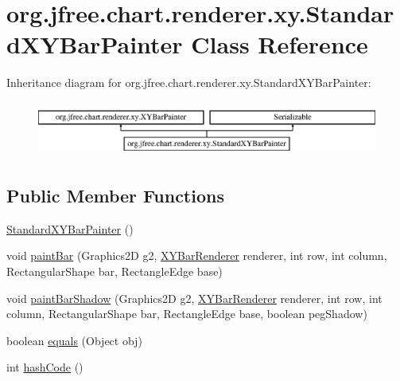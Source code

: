 \hypertarget{classorg_1_1jfree_1_1chart_1_1renderer_1_1xy_1_1_standard_x_y_bar_painter}{}\section{org.\+jfree.\+chart.\+renderer.\+xy.\+Standard\+X\+Y\+Bar\+Painter Class Reference}
\label{classorg_1_1jfree_1_1chart_1_1renderer_1_1xy_1_1_standard_x_y_bar_painter}
Inheritance diagram for org.\+jfree.\+chart.\+renderer.\+xy.\+Standard\+X\+Y\+Bar\+Painter\+:\begin{figure}[H]
\begin{center}
\leavevmode
\includegraphics[height=1.830065cm]{classorg_1_1jfree_1_1chart_1_1renderer_1_1xy_1_1_standard_x_y_bar_painter}
\end{center}
\end{figure}
\subsection*{Public Member Functions}
\begin{DoxyCompactItemize}
\item 
\mbox{\hyperlink{classorg_1_1jfree_1_1chart_1_1renderer_1_1xy_1_1_standard_x_y_bar_painter_ac077b66f861173d45580eaf8df7466fb}{Standard\+X\+Y\+Bar\+Painter}} ()
\item 
void \mbox{\hyperlink{classorg_1_1jfree_1_1chart_1_1renderer_1_1xy_1_1_standard_x_y_bar_painter_a9fbe9b7f844eeac7202c267f58e65224}{paint\+Bar}} (Graphics2D g2, \mbox{\hyperlink{classorg_1_1jfree_1_1chart_1_1renderer_1_1xy_1_1_x_y_bar_renderer}{X\+Y\+Bar\+Renderer}} renderer, int row, int column, Rectangular\+Shape bar, Rectangle\+Edge base)
\item 
void \mbox{\hyperlink{classorg_1_1jfree_1_1chart_1_1renderer_1_1xy_1_1_standard_x_y_bar_painter_afadfa70a676573cc497b8a66f3ca1d8d}{paint\+Bar\+Shadow}} (Graphics2D g2, \mbox{\hyperlink{classorg_1_1jfree_1_1chart_1_1renderer_1_1xy_1_1_x_y_bar_renderer}{X\+Y\+Bar\+Renderer}} renderer, int row, int column, Rectangular\+Shape bar, Rectangle\+Edge base, boolean peg\+Shadow)
\item 
boolean \mbox{\hyperlink{classorg_1_1jfree_1_1chart_1_1renderer_1_1xy_1_1_standard_x_y_bar_painter_a1149fa1ee2b6b628a59ecf334d2221de}{equals}} (Object obj)
\item 
int \mbox{\hyperlink{classorg_1_1jfree_1_1chart_1_1renderer_1_1xy_1_1_standard_x_y_bar_painter_a1bbd626367eb7fceb314879ca88d3830}{hash\+Code}} ()
\end{DoxyCompactItemize}


